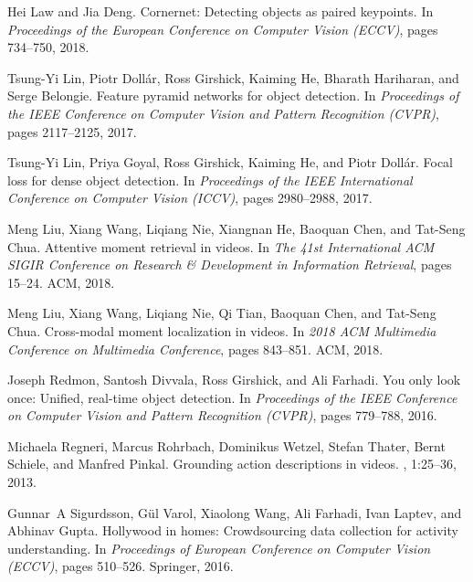 \documentclass[10pt,twocolumn,letterpaper]{article}
\begin{document}
\begin{thebibliography}{10}
	Hei Law and Jia Deng.
	\newblock Cornernet: Detecting objects as paired keypoints.
	\newblock In {\em Proceedings of the European Conference on Computer Vision
		(ECCV)}, pages 734--750, 2018.
	
	Tsung-Yi Lin, Piotr Doll{\'a}r, Ross Girshick, Kaiming He, Bharath Hariharan,
	and Serge Belongie.
	\newblock Feature pyramid networks for object detection.
	\newblock In {\em Proceedings of the IEEE Conference on Computer Vision and
		Pattern Recognition (CVPR)}, pages 2117--2125, 2017.
	
	Tsung-Yi Lin, Priya Goyal, Ross Girshick, Kaiming He, and Piotr Doll{\'a}r.
	\newblock Focal loss for dense object detection.
	\newblock In {\em Proceedings of the IEEE International Conference on Computer
		Vision (ICCV)}, pages 2980--2988, 2017.
	
	Meng Liu, Xiang Wang, Liqiang Nie, Xiangnan He, Baoquan Chen, and Tat-Seng
	Chua.
	\newblock Attentive moment retrieval in videos.
	\newblock In {\em The 41st International ACM SIGIR Conference on Research \&
		Development in Information Retrieval}, pages 15--24. ACM, 2018.
	
	Meng Liu, Xiang Wang, Liqiang Nie, Qi Tian, Baoquan Chen, and Tat-Seng Chua.
	\newblock Cross-modal moment localization in videos.
	\newblock In {\em 2018 ACM Multimedia Conference on Multimedia Conference},
	pages 843--851. ACM, 2018.
	
	Joseph Redmon, Santosh Divvala, Ross Girshick, and Ali Farhadi.
	\newblock You only look once: Unified, real-time object detection.
	\newblock In {\em Proceedings of the IEEE Conference on Computer Vision and
		Pattern Recognition (CVPR)}, pages 779--788, 2016.
	
	Michaela Regneri, Marcus Rohrbach, Dominikus Wetzel, Stefan Thater, Bernt
	Schiele, and Manfred Pinkal.
	\newblock Grounding action descriptions in videos.
	, 1:25--36, 2013.
	
	Gunnar~A Sigurdsson, G{\"u}l Varol, Xiaolong Wang, Ali Farhadi, Ivan Laptev,
	and Abhinav Gupta.
	\newblock Hollywood in homes: Crowdsourcing data collection for activity
	understanding.
	\newblock In {\em Proceedings of European Conference on Computer Vision
		(ECCV)}, pages 510--526. Springer, 2016.
	

\end{thebibliography}
\end{document}

